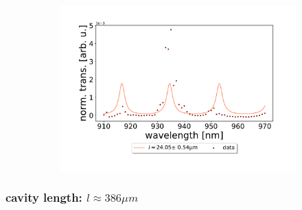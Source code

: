 \begin{figure}[h!]
\begin{subfigure}[b]{0.49\textwidth}
        \includegraphics[width=\textwidth]{figures/results/single fano fits/5um_off_res_fabry_perot.pdf}
        \caption{}
        \label{fig:5um_off_res_fabry_perot}
    \end{subfigure}
\end{figure}

\clearpage
\subsubsection*{cavity length: $l \approx 386 \mu m$}


